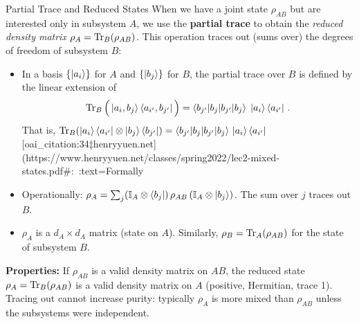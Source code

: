 \begin{frame}{Partial Trace and Reduced States}
  When we have a joint state $\rho_{AB}$ but are interested only in subsystem $A$, we use the \textbf{partial trace} to obtain the \emph{reduced density matrix} $\rho_A = \Tr_B(\rho_{AB})$. This operation traces out (sums over) the degrees of freedom of subsystem $B$:
  \begin{itemize}
    \item In a basis $\{\ket{a_i}\}$ for $A$ and $\{\ket{b_j}\}$ for $B$, the partial trace over $B$ is defined by the linear extension of 
      \[
        \Tr_B\Big(\ket{a_i, b_j}\bra{a_{i'}, b_{j'}}\Big) = \braket{b_{j'}|b_j}\;\ket{a_i}\bra{a_{i'}}\,.
      \] 
      That is, $\Tr_B(\ket{a_i}\bra{a_{i'}} \otimes \ket{b_j}\bra{b_{j'}}) = \braket{b_{j'}|b_j}\,\ket{a_i}\bra{a_{i'}}$ [oai_citation:34‡henryyuen.net](https://www.henryyuen.net/classes/spring2022/lec2-mixed-states.pdf#:~:text=Formally%
    \item Operationally: $\rho_A = \sum_{j} (\mathbb{I}_A \otimes \bra{b_j})\,\rho_{AB}\,(\mathbb{I}_A \otimes \ket{b_j})$. The sum over $j$ traces out $B$.
    \item $\rho_A$ is a $d_A \times d_A$ matrix (state on $A$). Similarly, $\rho_B = \Tr_A(\rho_{AB})$ for the state of subsystem $B$.
  \end{itemize}
  \textbf{Properties:} If $\rho_{AB}$ is a valid density matrix on $AB$, the reduced state $\rho_A = \Tr_B(\rho_{AB})$ is a valid density matrix on $A$ (positive, Hermitian, trace 1). Tracing out cannot increase purity: typically $\rho_A$ is more mixed than $\rho_{AB}$ unless the subsystems were independent.
\end{frame}

